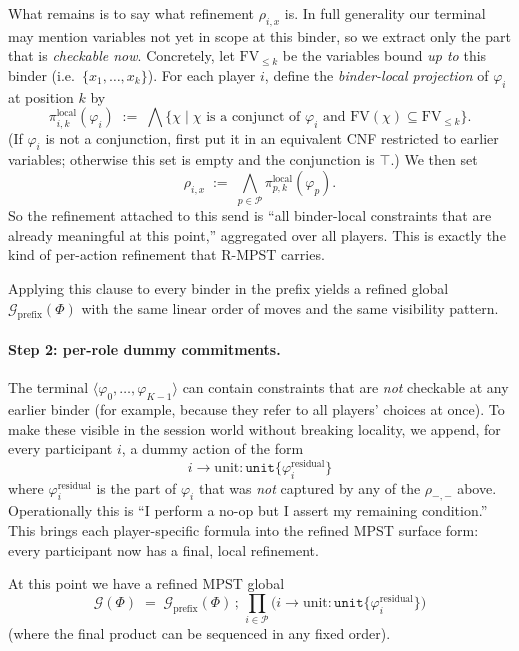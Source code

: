 What remains is to say what refinement \(\rho_{i,x}\) is. In full generality our
terminal may mention variables not yet in scope at this binder, so we extract
only the part that is \emph{checkable now}. Concretely, let
\(\mathrm{FV}_{\le k}\) be the variables bound \emph{up to} this binder (i.e.\
\(\{x_1,\dots,x_k\}\)). For each player \(i\), define the \emph{binder-local
projection} of \(\varphi_i\) at position \(k\) by
\[
  \pi^{\text{local}}_{i,k}(\varphi_i)
  \;:=\;
  \bigwedge \{ \chi \mid \chi \text{ is a conjunct of } \varphi_i
                    \text{ and } \mathrm{FV}(\chi) \subseteq \mathrm{FV}_{\le k} \}.
\]
(If \(\varphi_i\) is not a conjunction, first put it in an equivalent CNF
restricted to earlier variables; otherwise this set is empty and the
conjunction is \(\top\).) We then set
\[
  \rho_{i,x} \;:=\; \bigwedge_{p \in \mathcal{P}} \pi^{\text{local}}_{p,k}(\varphi_p).
\]
So the refinement attached to this send is “all binder-local constraints that
are already meaningful at this point,” aggregated over all players. This is
exactly the kind of per-action refinement that R-MPST carries.

Applying this clause to every binder in the prefix yields a refined global
\(\mathcal{G}_{\mathrm{prefix}}(\Phi)\) with the same linear order of moves and
the same visibility pattern.

\paragraph{Step 2: per-role dummy commitments.}
The terminal \(\langle \varphi_0,\dots,\varphi_{K-1} \rangle\) can contain
constraints that are \emph{not} checkable at any earlier binder (for example,
because they refer to all players’ choices at once). To make these visible in
the session world without breaking locality, we append, for every participant
\(i\), a dummy action of the form
\[
  i \to \text{unit} : \mathtt{unit} \{ \varphi_i^\mathrm{residual} \}
\]
where \(\varphi_i^\mathrm{residual}\) is the part of \(\varphi_i\) that was
\emph{not} captured by any of the \(\rho_{-, -}\) above. Operationally this is “I
perform a no-op but I assert my remaining condition.” This brings each
player-specific formula into the refined MPST surface form: every participant
now has a final, local refinement.

At this point we have a refined MPST global
\[
  \mathcal{G}(\Phi) \;=\; \mathcal{G}_{\mathrm{prefix}}(\Phi) \,;\,
                          \prod_{i \in \mathcal{P}} \bigl(i \to \text{unit} : \mathtt{unit} \{ \varphi_i^\mathrm{residual} \}\bigr)
\]
(where the final product can be sequenced in any fixed order).

